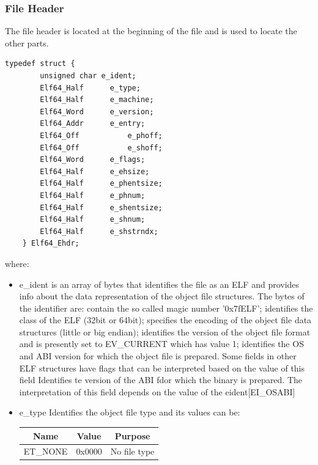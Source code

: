 \documentclass[paper=a4, fontsize=11pt]{report} %
\numberwithin{equation}{section} %
\numberwithin{figure}{section} %
\numberwithin{table}{section} %
\begin{document}
\subsubsection{File Header}
The file header is located at the beginning of the file and is used to locate 
the other parts.\newpage
\begin{lstlisting}[style=ansic, caption={File Header}, label=ehdr]
	typedef struct {
		unsigned char e_ident;
		Elf64_Half 		e_type;
		Elf64_Half 		e_machine;
		Elf64_Word 		e_version;
		Elf64_Addr 		e_entry;
		Elf64_Off			e_phoff;
		Elf64_Off			e_shoff;
		Elf64_Word		e_flags;
		Elf64_Half 		e_ehsize;
		Elf64_Half 		e_phentsize;
		Elf64_Half 		e_phnum;
		Elf64_Half 		e_shentsize;
		Elf64_Half 		e_shnum;
		Elf64_Half 		e_shstrndx;
	} Elf64_Ehdr;
\end{lstlisting}
where:
\begin{itemize}
	\item {\ttfamily e\_ident} is an array of bytes that identifies the file as 
	an ELF and provides info about the data representation of the object file 
	structures. The bytes of the identifier are:
	 contain the so called magic number 
	'0x7fELF';
	 identifies the class of the ELF 
	(32bit or 64bit);
	 specifies the encoding of the 
	object file data structures (little or big endian);
	 identifies the version of the 
	object file format and is presently set to EV\_CURRENT which has value 1;
	 identifies the OS and ABI version 
	for which the object file is prepared. Some fields in other ELF structures 
	have flags that can be interpreted based on the value of this field
	 Identifies te version of the 
	ABI fdor which the binary is prepared. The interpretation of this field 
	depends on the value of the {\ttfamily e\-ident[EI\_OSABI]}
	\item {\ttfamily e\_type} Identifies the object file type and its values 
	can be:\newline
	\begin{center}
			\begin{tabular}{|c|c|c|}
			\hline
			\textbf{Name} & \textbf{Value} & \textbf{Purpose} \\ \hline
			{\ttfamily ET\_NONE} & 0x0000 & No file type \\ \hline

\end{tabular}
\end{center}
\end{itemize}
\end{document}
